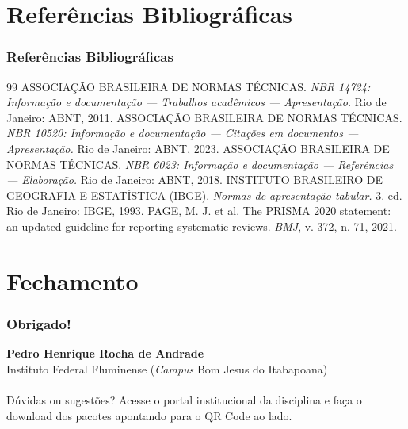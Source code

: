 \documentclass[10pt, aspectratio=169]{slidesiffmodelo}
\begin{document}
\section{Referências Bibliográficas}
\begin{frame}[t,allowframebreaks]
    \frametitle{Referências Bibliográficas}
    \begin{thebibliography}{99}
     ASSOCIAÇÃO BRASILEIRA DE NORMAS TÉCNICAS. \textit{NBR 14724: Informação e documentação --- Trabalhos acadêmicos --- Apresentação.} Rio de Janeiro: ABNT, 2011.
     ASSOCIAÇÃO BRASILEIRA DE NORMAS TÉCNICAS. \textit{NBR 10520: Informação e documentação --- Citações em documentos --- Apresentação.} Rio de Janeiro: ABNT, 2023.
     ASSOCIAÇÃO BRASILEIRA DE NORMAS TÉCNICAS. \textit{NBR 6023: Informação e documentação --- Referências --- Elaboração.} Rio de Janeiro: ABNT, 2018.
     INSTITUTO BRASILEIRO DE GEOGRAFIA E ESTATÍSTICA (IBGE). \textit{Normas de apresentação tabular.} 3. ed. Rio de Janeiro: IBGE, 1993.
     PAGE, M. J. et al. The PRISMA 2020 statement: an updated guideline for reporting systematic reviews. \textit{BMJ}, v. 372, n. 71, 2021.
    \end{thebibliography}
\end{frame}

\section{Fechamento}
\begin{frame}[t]
    \frametitle{Obrigado!}
    \begin{textoimagem}
        \textbf{Pedro Henrique Rocha de Andrade}\\
        Instituto Federal Fluminense (\textit{Campus} Bom Jesus do Itabapoana)\\
        \email\\
        \vspace{0.4cm}
        Dúvidas ou sugestões? Acesse o portal institucional da disciplina e faça o download dos pacotes apontando para o QR Code ao lado.
    \colunaimagem
    \end{textoimagem}
\end{frame}
\end{document}
